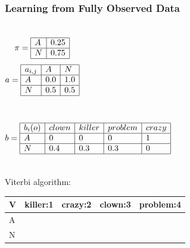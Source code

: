 \begin{frame}[fragile]
\frametitle{Learning from Fully Observed Data}
{\color{blue}
\begin{center}
\begin{columns}[c]
\column{0.5in}
\[ \pi = \begin{array}{|l|l|}
\hline
A & 0.25 \\ \hline
N & 0.75 \\ \hline
\end{array}
\]
\pause
\column{0.65in}
\[ a = \begin{array}{|l|l|l|}
\hline
a_{i,j} & A & N \\ \hline
A & 0.0 & 1.0 \\ \hline
N & 0.5 & 0.5 \\ \hline
\end{array}
\]
\end{columns}
\pause
\begin{columns}[c]
\column{3in}
\[ b = \begin{array}{|l|l|l|l|l|}
\hline
b_i(o) & clown & killer & problem & crazy \\ \hline
A & 0 & 0 & 0 & 1 \\ \hline
N & 0.4 & 0.3 & 0.3 & 0 \\ \hline
\end{array}
\]
\end{columns}
\end{center}
\pause
\smallskip
Viterbi algorithm:\\
\begin{center}
\begin{tabular}{|p{1cm}|p{2cm}|p{2cm}|p{2cm}|p{2cm}|}
\hline
{\bf V} & killer:1 & crazy:2 & clown:3 & problem:4 \\ \hline
A & & & & \\ \hline
N & & & & \\ \hline
\end{tabular}
\end{center}
}
\end{frame}

